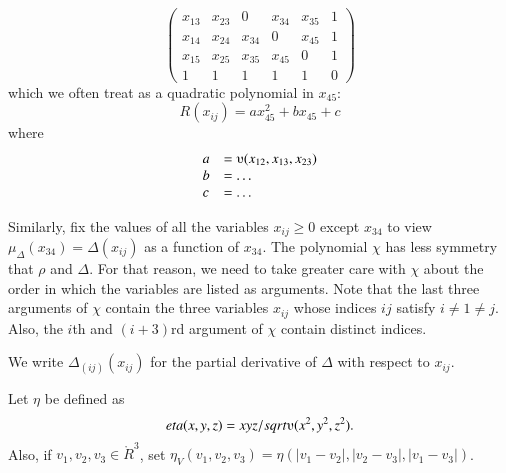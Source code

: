 \begin{tarskidata}
\begin{tarski}
\begin{definition}
$$\begin{pmatrix}
 x_{13} & x_{23} & 0 & x_{34} & x_{35} & 1 \\
 x_{14} & x_{24} & x_{34} & 0 & x_{45} & 1 \\
 x_{15} & x_{25} & x_{35} & x_{45} & 0 & 1 \\
 1 & 1 & 1 & 1 & 1 & 0
\end{pmatrix}
$$
which we often treat as a quadratic polynomial in $x_{45}$:
$$
R(x_{ij}) = a x_{45}^2  +  b x_{45} + c
$$
where
$$
\begin{array}{lll}
  a &= \ups(x_{12},x_{13},x_{23}) \\
  b &= \ldots\\
  c &= \ldots\\
\end{array}
$$
\end{definition}
Similarly, fix the values of all the variables $x_{ij}\ge 0$ except
$x_{34}$ to view $\mu_\Delta(x_{34})=\Delta(x_{ij})$ as a function of $x_{34}$.  %
The polynomial $\chi$ has less symmetry that $\rho$ and $\Delta$.  For that
reason, we need to take greater care with $\chi$ about the order in which the variables are
listed as arguments.  Note that the last three arguments of
$\chi$ contain the three variables $x_{ij}$ whose indices $ij$ satisfy $i\ne 1\ne j$.
Also, the $i$th and $(i+3)$rd argument of $\chi$ contain distinct indices.

We write $\Delta_{(ij)}(x_{ij})$ for the partial derivative of $\Delta$
with respect to $x_{ij}$.
\end{tarski}





\begin{tarski}

\begin{definition}
%
Let $\eta$ be defined as
	$$\eta(x,y,z) = x y z/\sqrt{\ups(x^2,y^2,z^2)}.$$
Also, if $v_1,v_2,v_3\in\ring{R}^3$, set
   $\eta_V(v_1,v_2,v_3) =\eta(|v_1-v_2|,|v_2-v_3|,|v_1-v_3|)$.
\end{definition}
\end{tarski}

\begin{tarski}


\end{tarski}
\end{tarskidata}
